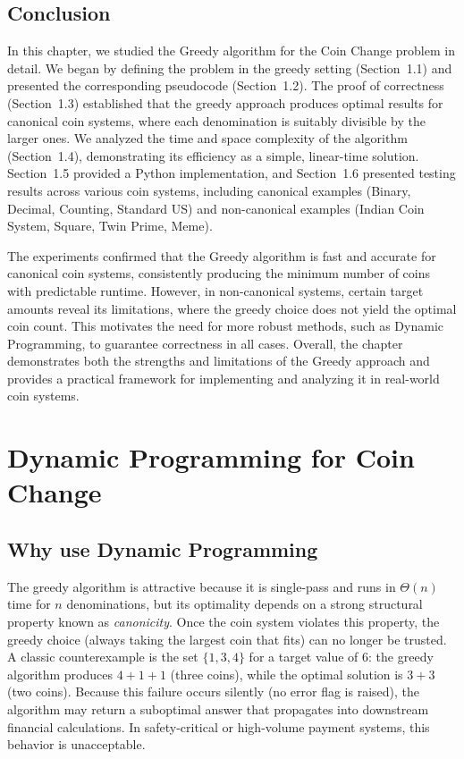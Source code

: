 \documentclass[12pt,a4paper]{report}
\begin{document}
\section{Conclusion}
\label{sec:greedy_conclusion}

In this chapter, we studied the Greedy algorithm for the Coin Change problem in detail. We began by defining the problem in the greedy setting (Section~1.1) and presented the corresponding pseudocode (Section~1.2). The proof of correctness (Section~1.3) established that the greedy approach produces optimal results for canonical coin systems, where each denomination is suitably divisible by the larger ones. We analyzed the time and space complexity of the algorithm (Section~1.4), demonstrating its efficiency as a simple, linear-time solution. Section~1.5 provided a Python implementation, and Section~1.6 presented testing results across various coin systems, including canonical examples (Binary, Decimal, Counting, Standard US) and non-canonical examples (Indian Coin System, Square, Twin Prime, Meme).

The experiments confirmed that the Greedy algorithm is fast and accurate for canonical coin systems, consistently producing the minimum number of coins with predictable runtime. However, in non-canonical systems, certain target amounts reveal its limitations, where the greedy choice does not yield the optimal coin count. This motivates the need for more robust methods, such as Dynamic Programming, to guarantee correctness in all cases. Overall, the chapter demonstrates both the strengths and limitations of the Greedy approach and provides a practical framework for implementing and analyzing it in real-world coin systems.


\chapter{Dynamic Programming for Coin Change \centering}
\section{Why use Dynamic Programming}
\label{sec:dp-algo}
The greedy algorithm is attractive because it is single-pass and runs in $\Theta(n)$ time for $n$ denominations, but its optimality depends on a strong structural property known as \textit{canonicity}. Once the coin system violates this property, the greedy choice (always taking the largest coin that fits) can no longer be trusted. A classic counterexample is the set $\{1, 3, 4\}$ for a target value of $6$: the greedy algorithm produces $4 + 1 + 1$ (three coins), while the optimal solution is $3 + 3$ (two coins). Because this failure occurs silently (no error flag is raised), the algorithm may return a suboptimal answer that propagates into downstream financial calculations. In safety-critical or high-volume payment systems, this behavior is unacceptable.
\end{document}
